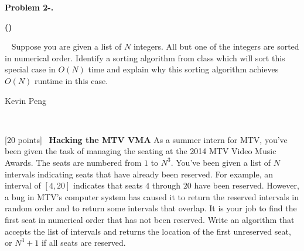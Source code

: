 \documentclass[12pt,twoside]{article}
\makeatletter
\newcommand{\points}[1]{[#1 points]\ }
\newcounter{problemnum}
\newcommand{\theproblem}{Problem \theproblemsetnum-\arabic{problemnum}}
\newenvironment{problems}{
        \begin{list}{{\bf \theproblem. \hspace*{0.5em}}}
        {\setlength{\leftmargin}{0em}
         \setlength{\rightmargin}{0em}
         \setlength{\labelwidth}{0em}
         \setlength{\labelsep}{0em}
         \usecounter{problemnum}}}{\end{list}}
\newcommand{\problem}[1][{}]{\item \let\@currentlabel=\theproblem \textbf{#1}}
\newcounter{problempartnum}[problemnum]
\newenvironment{problemparts}{
        \begin{list}{{\bf (\alph{problempartnum})}}
        {\setlength{\leftmargin}{2.5em}
         \setlength{\rightmargin}{2.5em}
         \setlength{\labelsep}{0.5em}}}{\end{list}}
\newcommand{\problempart}{\addtocounter{problempartnum}{1}\item}
\newcommand{\theproblemsetnum}{2}
\newcommand{\yourname}{Kevin Peng}
\makeatother
\begin{document}
\begin{problems}
\begin{problemparts}

\problempart \points{5}
Suppose you are given a list of $N$ integers. All but one of the integers are sorted in numerical order. Identify a sorting algorithm from class which will sort this special case in $O(N)$ time and  explain why this sorting algorithm achieves $O(N)$ runtime in this case.


\end{problemparts}

\newpage
\begin{large} \yourname \end{large} \\


\problem \points{20} \textbf{Hacking the MTV VMA}
As a summer intern for MTV, you've been given the task of managing the seating at the 2014 MTV Video Music Awards. The seats are numbered from $1$ to $N^3$. You've been given a list of $N$ intervals indicating seats that have already been reserved. For example, an interval of $[4, 20]$ indicates that seats $4$ through $20$ have been reserved. However, a bug in MTV's computer system has caused it to return the reserved intervals in random order and to return some intervals that overlap. It is your job to find the first seat in numerical order that has not been reserved. Write an algorithm that accepts the list of intervals and returns the location of the first unreserved seat, or $N^3+1$ if all seats are reserved.


\end{problems}
\end{document}
